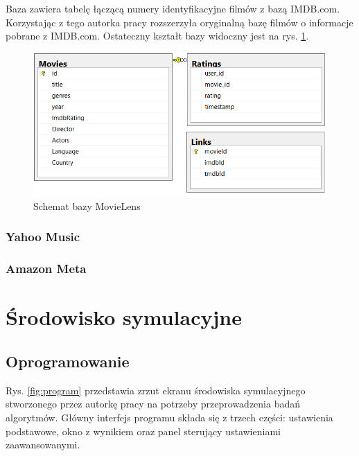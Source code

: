 \documentclass[twoside]{iisthesis}
\begin{document}
		Baza zawiera tabelę łączącą numery identyfikacyjne filmów z bazą IMDB.com. Korzystając z tego autorka pracy rozszerzyła oryginalną bazę filmów o informacje pobrane z IMDB.com. Ostateczny kształt bazy widoczny jest na rys. \ref{fig:movielens_schema}.
		
			\begin{figure}[!ht] 
				\centering
				\includegraphics[width=1\textwidth]{movielens}
				\caption{Schemat bazy MovieLens}
				\label{fig:movielens_schema}
			\end{figure}
		
		\subsubsection{Yahoo Music}
		
		
		\subsubsection{Amazon Meta}
		
		
			\cite{leskovec2007dynamics}
		
	\section{Środowisko symulacyjne}
	
		\subsection{Oprogramowanie}
	
		Rys. \ref{fig:program} przedstawia zrzut ekranu środowiska symulacyjnego stworzonego przez autorkę pracy na potrzeby przeprowadzenia badań algorytmów. Główny interfejs programu składa się z trzech części: ustawienia podstawowe, okno z wynikiem oraz panel sterujący ustawieniami zaawansowanymi. 
	
\end{document}
